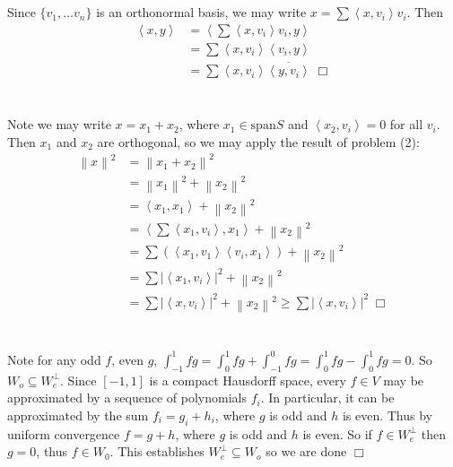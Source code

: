 \documentclass{article}
\newcommand{\innerprod}[2]{\left\langle #1 , #2 \right\rangle}
\newcommand{\norm}[1]{\left\lVert#1\right\rVert}
\begin{document}
\section{}
Since $\{ v_1,\dots v_n \}$ is an orthonormal basis, we may write $x = \sum \innerprod{x}{v_i}v_i$. Then
\begin{equation*}
\begin{split}
    \innerprod{x}{y} &= \innerprod{\sum \innerprod{x}{v_i}v_i}{y}\\
    &= \sum \innerprod{x}{v_i}\innerprod{v_i}{y}\\
    &= \sum \innerprod{x}{v_i} \overline{\innerprod{y}{v_i}} \; \Box
\end{split}
\end{equation*}

\section{}
Note we may write $x = x_1 + x_2$, where $x_1 \in \textrm{span}S$ and $\innerprod{x_2}{v_i} = 0$ for all $v_i$. Then $x_1$ and $x_2$ are orthogonal, so we may apply the result of problem (2):
\begin{equation*}
\begin{split}
    \norm{x}^2 &= \norm{x_1 + x_2}^2\\
    &= \norm{x_1}^2 + \norm{x_2}^2\\
    &= \innerprod{x_1}{x_1} + \norm{x_2}^2\\
    &= \innerprod{\sum \innerprod{x_1}{v_i}}{x_1} + \norm{x_2}^2\\
    &= \sum \left(\innerprod{x_1}{v_1}\innerprod{v_i}{x_1}\right) + \norm{x_2}^2 \\
    &= \sum \left| \innerprod{x_1}{v_i}\right|^2 + \norm{x_2}^2\\
    &= \sum \left| \innerprod{x}{v_i}\right|^2 + \norm{x_2}^2 \geq \sum \left| \innerprod{x}{v_i}\right|^2 \; \Box
\end{split}
\end{equation*}

\section{}
Note for any odd $f$, even $g$, $\int_{-1}^1 fg = \int_0^1 fg + \int_{-1}^0 fg = \int_0^1 fg - \int_0^1 fg = 0$. So $W_o \subseteq W_e^\perp$. Since $[-1,1]$ is a compact Hausdorff space, every $f \in V$ may be approximated by a sequence of polynomials $f_i$. In particular, it can be approximated by the sum $f_i = g_i + h_i$, where $g$ is odd and $h$ is even. Thus by uniform convergence $f = g + h$, where $g$ is odd and $h$ is even. So if $f \in W_e^\perp$ then $g = 0$, thus $f \in W_0$. This establishes $W_e^\perp \subseteq W_o$ so we are done $\Box$
\end{document}
